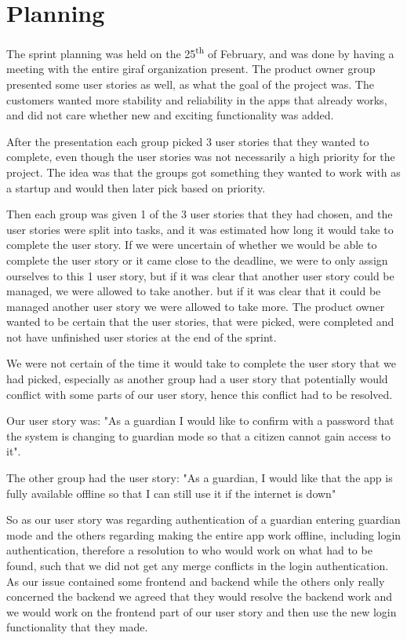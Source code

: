 \section{Planning}
The sprint planning was held on the 25\textsuperscript{th} of February, and was done by having a meeting with the entire giraf organization present. 
The product owner group presented some user stories as well, as what the goal of the project was. 
The customers wanted more stability and reliability in the apps that already works, and did not care whether new and exciting functionality was added. 

After the presentation each group picked 3 user stories that they wanted to complete, even though the user stories was not necessarily a high priority for the project. 
The idea was that the groups got something they wanted to work with as a startup and would then later pick based on priority.

Then each group was given 1 of the 3 user stories that they had chosen, and the user stories were split into tasks, and it was estimated how long it would take to complete the user story. 
If we were uncertain of whether we would be able to complete the user story or it came close to the deadline, we were to only assign ourselves to this 1 user story, but if it was clear that another user story could be managed, we were allowed to take another.
but if it was clear that it could be managed another user story we were allowed to take more. 
The product owner wanted to be certain that the user stories, that were picked, were completed and not have unfinished user stories at the end of the sprint.

We were not certain of the time it would take to complete the user story that we had picked, especially as another group had a user story that potentially would conflict with some parts of our user story, hence this conflict had to be resolved.

Our user story was: "As a guardian I would like to confirm with a password that the system is changing to guardian mode so that a citizen cannot gain access to it".

The other group had the user story: "As a guardian, I would like that the app is fully available offline so that I can still use it if the internet is down"

So as our user story was regarding authentication of a guardian entering guardian mode and the others regarding making the entire app work offline, including login authentication, therefore a resolution to who would work on what had to be found, such that we did not get any merge conflicts in the login authentication. 
As our issue contained some frontend and backend while the others only really concerned the backend we agreed that they would resolve the backend work and we would work on the frontend part of our user story and then use the new login functionality that they made.

